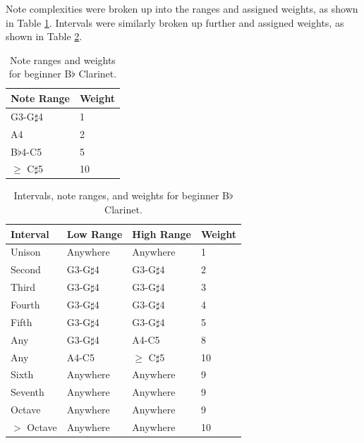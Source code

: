 \documentclass[10pt,preprint]{sigplanconf}
\begin{document}
Note complexities were broken up into the ranges and assigned weights, as shown in Table \ref{table:notes}. Intervals were similarly broken up further and assigned weights, as shown in Table \ref{table:intervals}.  

\begin{table}[t]
	\centering
    \begin{tabular}{| l | l |}
        \hline
        Note Range & Weight \\ \hline
        G3-G$\sharp$4 & 1 \\ \hline
        A4 & 2 \\ \hline
        B$\flat$4-C5 & 5 \\ \hline
        $\geq$ C$\sharp$5 & 10 \\
        \hline
    \end{tabular}
	\caption{Note ranges and weights for beginner B$\flat$ Clarinet.}
	\label{table:notes}
\end{table}

\begin{table}[t]
	\centering
    \begin{tabular}{| l | l | l | l |}
        \hline
        Interval & Low Range & High Range & Weight \\ \hline
        Unison & Anywhere & Anywhere & 1 \\ \hline
        Second & G3-G$\sharp$4 & G3-G$\sharp$4 & 2 \\ \hline
        Third & G3-G$\sharp$4 & G3-G$\sharp$4 & 3 \\ \hline
        Fourth & G3-G$\sharp$4 & G3-G$\sharp$4 & 4 \\ \hline
        Fifth & G3-G$\sharp$4 & G3-G$\sharp$4 & 5 \\ \hline
        Any & G3-G$\sharp$4 & A4-C5 & 8 \\ \hline
        Any & A4-C5 & $\geq$ C$\sharp$5 & 10 \\ \hline
        Sixth & Anywhere & Anywhere & 9 \\ \hline
        Seventh & Anywhere & Anywhere & 9 \\ \hline
        Octave & Anywhere & Anywhere & 9 \\ \hline
        $>$ Octave & Anywhere & Anywhere & 10 \\
        \hline
    \end{tabular}
	\caption{Intervals, note ranges, and weights for beginner B$\flat$ Clarinet.}
	\label{table:intervals}
\end{table}
\end{document}
